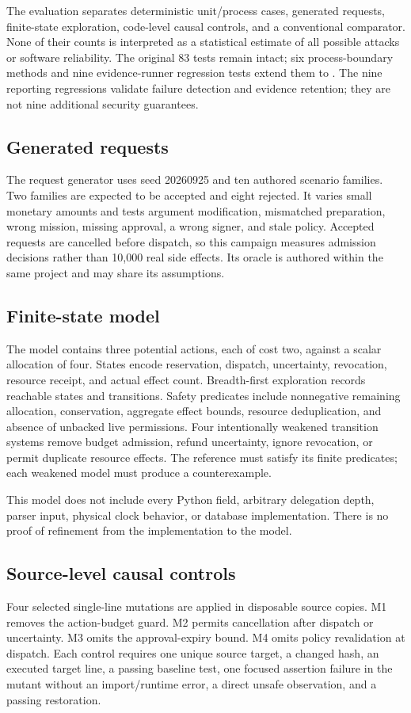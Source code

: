 \documentclass[10pt,journal,a4paper]{IEEEtran}
\begin{document}
The evaluation separates deterministic unit/process cases, generated requests, finite-state exploration, code-level causal controls, and a conventional comparator. None of their counts is interpreted as a statistical estimate of all possible attacks or software reliability. The original 83 tests remain intact; six process-boundary methods and nine evidence-runner regression tests extend them to \UnitCount{}. The nine reporting regressions validate failure detection and evidence retention; they are not nine additional security guarantees.

\subsection{Generated requests}
The request generator uses seed 20260925 and ten authored scenario families. Two families are expected to be accepted and eight rejected. It varies small monetary amounts and tests argument modification, mismatched preparation, wrong mission, missing approval, a wrong signer, and stale policy. Accepted requests are cancelled before dispatch, so this campaign measures admission decisions rather than 10,000 real side effects. Its oracle is authored within the same project and may share its assumptions.

\subsection{Finite-state model}
The model contains three potential actions, each of cost two, against a scalar allocation of four. States encode reservation, dispatch, uncertainty, revocation, resource receipt, and actual effect count. Breadth-first exploration records reachable states and transitions. Safety predicates include nonnegative remaining allocation, conservation, aggregate effect bounds, resource deduplication, and absence of unbacked live permissions. Four intentionally weakened transition systems remove budget admission, refund uncertainty, ignore revocation, or permit duplicate resource effects. The reference must satisfy its finite predicates; each weakened model must produce a counterexample.

This model does not include every Python field, arbitrary delegation depth, parser input, physical clock behavior, or database implementation. There is no proof of refinement from the implementation to the model.

\subsection{Source-level causal controls}
Four selected single-line mutations are applied in disposable source copies. M1 removes the action-budget guard. M2 permits cancellation after dispatch or uncertainty. M3 omits the approval-expiry bound. M4 omits policy revalidation at dispatch. Each control requires one unique source target, a changed hash, an executed target line, a passing baseline test, one focused assertion failure in the mutant without an import/runtime error, a direct unsafe observation, and a passing restoration.
\end{document}
